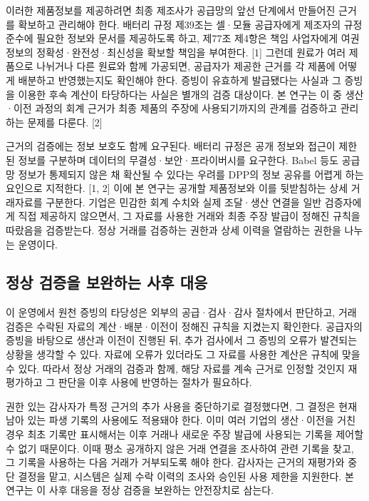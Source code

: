 \documentclass[11pt,a4paper]{article}
\begin{document}
이러한 제품정보를 제공하려면 최종 제조사가 공급망의 앞선 단계에서 만들어진 근거를 확보하고 관리해야 한다.
배터리 규정 제39조는 셀·모듈 공급자에게 제조자의 규정 준수에 필요한 정보와 문서를 제공하도록 하고, 제77조 제4항은 책임 사업자에게 여권 정보의 정확성·완전성·최신성을 확보할 책임을 부여한다. [1]
그런데 원료가 여러 제품으로 나뉘거나 다른 원료와 함께 가공되면, 공급자가 제공한 근거를 각 제품에 어떻게 배분하고 반영했는지도 확인해야 한다.
증빙이 유효하게 발급됐다는 사실과 그 증빙을 이용한 후속 계산이 타당하다는 사실은 별개의 검증 대상이다.
본 연구는 이 중 생산·이전 과정의 회계 근거가 최종 제품의 주장에 사용되기까지의 관계를 검증하고 관리하는 문제를 다룬다. [2]

근거의 검증에는 정보 보호도 함께 요구된다.
배터리 규정은 공개 정보와 접근이 제한된 정보를 구분하며 데이터의 무결성·보안·프라이버시를 요구한다.
Babel 등도 공급망 정보가 통제되지 않은 채 확산될 수 있다는 우려를 DPP의 정보 공유를 어렵게 하는 요인으로 지적한다. [1, 2]
이에 본 연구는 공개할 제품정보와 이를 뒷받침하는 상세 거래자료를 구분한다.
기업은 민감한 회계 수치와 실제 조달·생산 연결을 일반 검증자에게 직접 제공하지 않으면서, 그 자료를 사용한 거래와 최종 주장 발급이 정해진 규칙을 따랐음을 검증받는다.
정상 거래를 검증하는 권한과 상세 이력을 열람하는 권한을 나누는 운영이다.

\clearpage
\subsection{정상 검증을 보완하는 사후 대응}
이 운영에서 원천 증빙의 타당성은 외부의 공급·검사·감사 절차에서 판단하고, 거래 검증은 수락된 자료의 계산·배분·이전이 정해진 규칙을 지켰는지 확인한다.
공급자의 증빙을 바탕으로 생산과 이전이 진행된 뒤, 추가 검사에서 그 증빙의 오류가 발견되는 상황을 생각할 수 있다.
자료에 오류가 있더라도 그 자료를 사용한 계산은 규칙에 맞을 수 있다.
따라서 정상 거래의 검증과 함께, 해당 자료를 계속 근거로 인정할 것인지 재평가하고 그 판단을 이후 사용에 반영하는 절차가 필요하다.

권한 있는 감사자가 특정 근거의 추가 사용을 중단하기로 결정했다면, 그 결정은 현재 남아 있는 파생 기록의 사용에도 적용돼야 한다.
이미 여러 기업의 생산·이전을 거친 경우 최초 기록만 표시해서는 이후 거래나 새로운 주장 발급에 사용되는 기록을 제어할 수 없기 때문이다.
이때 평소 공개하지 않은 거래 연결을 조사하여 관련 기록을 찾고, 그 기록을 사용하는 다음 거래가 거부되도록 해야 한다.
감사자는 근거의 재평가와 중단 결정을 맡고, 시스템은 실제 수락 이력의 조사와 승인된 사용 제한을 지원한다.
본 연구는 이 사후 대응을 정상 검증을 보완하는 안전장치로 삼는다.
\end{document}
